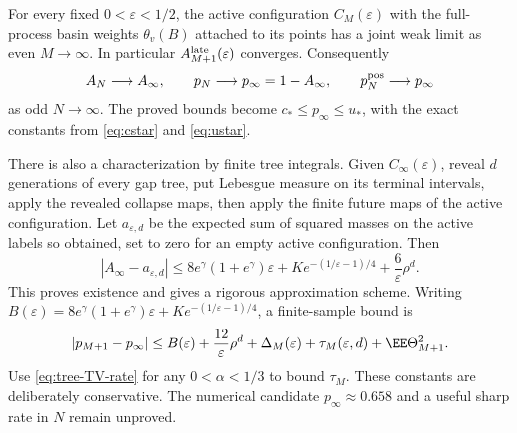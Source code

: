 \documentclass[11pt,letterpaper]{article}
\begin{document}
\begin{theorem}
\label{thm:noise-convergence}
For every fixed $0<\varepsilon<1/2$, the active configuration
$C_M(\varepsilon)$ with the full-process basin weights $\theta_v(B)$
attached to its points has a joint weak limit as even $M\to\infty$.
In particular $A_{M+1}^{\rm late}(\varepsilon)$ converges. Consequently
\begin{equation}\label{eq:noise-limit-exists}
 A_N\longrightarrow A_\infty,\qquad
 p_N\longrightarrow p_\infty=1-A_\infty,\qquad
 p_N^{\rm pos}\longrightarrow p_\infty
\end{equation}
as odd $N\to\infty$. The proved bounds become
$c_*\le p_\infty\le u_*$, with the exact constants from
\eqref{eq:cstar} and \eqref{eq:ustar}.

There is also a characterization by finite tree integrals. Given
$C_\infty(\varepsilon)$, reveal $d$ generations of every gap tree,
put Lebesgue measure on its terminal intervals, apply the revealed
collapse maps, then apply the finite future maps of the active
configuration. Let $a_{\varepsilon,d}$ be the expected sum of squared
masses on the active labels so obtained, set to zero for an empty
active configuration. Then
\begin{equation}\label{eq:limit-approximation}
 |A_\infty-a_{\varepsilon,d}|
 \le8e^\gamma(1+e^\gamma)\varepsilon
      +K e^{-(1/\varepsilon-1)/4}
      +\frac6\varepsilon\rho^d.
\end{equation}
This proves existence and gives a rigorous approximation scheme.
Writing
$B(\varepsilon)=8e^\gamma(1+e^\gamma)\varepsilon+
K e^{-(1/\varepsilon-1)/4}$, a finite-sample bound is
\begin{equation}\label{eq:finite-noise-error}
 |p_{M+1}-p_\infty|
 \le B(\varepsilon)+\frac{12}{\varepsilon}\rho^d
       +\Delta_M(\varepsilon)+\tau_M(\varepsilon,d)
       +\EE\Theta_{M+1}^2.
\end{equation}
Use \eqref{eq:tree-TV-rate} for any $0<\alpha<1/3$ to bound $\tau_M$.
These constants are deliberately conservative. The numerical candidate
$p_\infty\approx0.658$ and a useful sharp rate in $N$ remain unproved.
\end{theorem}
\end{document}
